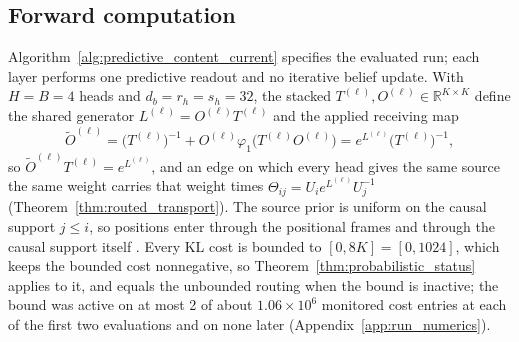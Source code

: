 \documentclass[twoside,11pt]{article}
\begin{document}
\subsection{Forward computation}
\label{sec:lm_forward}

Algorithm~\ref{alg:predictive_content_current} specifies the evaluated run; each layer performs one predictive readout and no iterative belief update. With $H=B=4$ heads and $d_b=r_h=s_h=32$, %
the stacked $T^{(\ell)},O^{(\ell)}\in\mathbb R^{K\times K}$ define the shared generator $L^{(\ell)}=O^{(\ell)}T^{(\ell)}$ and the applied receiving map
\begin{equation}
\widetilde O^{(\ell)}=\bigl(T^{(\ell)}\bigr)^{-1}+O^{(\ell)}\varphi_1\bigl(T^{(\ell)}O^{(\ell)}\bigr)=e^{L^{(\ell)}}\bigl(T^{(\ell)}\bigr)^{-1},
\label{eq:lm_exponential_receiving_map}
\end{equation}
so $\widetilde O^{(\ell)}T^{(\ell)}=e^{L^{(\ell)}}$, and an edge on which every head gives the same source the same weight carries that weight times $\Theta_{ij}=U_ie^{L^{(\ell)}}U_j^{-1}$ (Theorem~\ref{thm:routed_transport}). The source prior is uniform on the causal support $j\le i$, so positions enter through the positional frames and through the causal support itself \citep{Haviv2022NoPos}. Every KL cost is bounded to $[0,8K]=[0,1024]$, %
which keeps the bounded cost nonnegative, so Theorem~\ref{thm:probabilistic_status} applies to it, and equals the unbounded routing when the bound is inactive; the bound was active on at most 2 of about $1.06\times10^6$ monitored cost entries at each of the first two evaluations and on none later (Appendix~\ref{app:run_numerics}).
\end{document}
